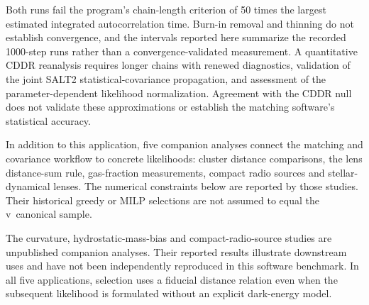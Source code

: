 Both runs fail the program's chain-length criterion of 50 times the largest estimated integrated autocorrelation time. Burn-in removal and thinning do not establish convergence, and the intervals reported here summarize the recorded 1000-step runs rather than a convergence-validated measurement. A quantitative CDDR reanalysis requires longer chains with renewed diagnostics, validation of the joint SALT2 statistical-covariance propagation, and assessment of the parameter-dependent likelihood normalization. Agreement with the CDDR null does not validate these approximations or establish the matching software's statistical accuracy.



In addition to this application, five companion analyses connect the matching and covariance workflow to concrete likelihoods: cluster distance comparisons, the lens distance-sum rule, gas-fraction measurements, compact radio sources and stellar-dynamical lenses. The numerical constraints below are reported by those studies. Their historical greedy or MILP selections are not assumed to equal the v\version\ canonical sample.

The curvature, hydrostatic-mass-bias and compact-radio-source studies are unpublished companion analyses. Their reported results illustrate downstream uses and have not been independently reproduced in this software benchmark. In all five applications, selection uses a fiducial distance relation even when the subsequent likelihood is formulated without an explicit dark-energy model.
